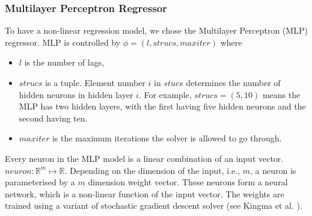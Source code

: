 \subsubsection{Multilayer Perceptron Regressor}
To have a non-linear regression model, we chose the Multilayer Perceptron (MLP) regressor. MLP is controlled by $\phi = (l, strucs, max iter)$ where
\begin{itemize}
    \item $l$ is the number of lags,
    \item $strucs$ is a tuple. Element number $i$ in $stucs$ determines the number of hidden neurons in hidden layer $i$. For example, $strucs = (5, 10)$ means the MLP has two hidden layers, with the first having five hidden neurons and the second having ten.
    \item $max iter$ is the maximum iterations the solver is allowed to go through.
\end{itemize}
Every neuron in the MLP model is a linear combination of an input vector. $neuron: \mathbb{R}^m \longmapsto \mathbb{R}$. Depending on the dimension of the input, i.e., $m$, a neuron is parameterised by a $m$ dimension weight vector. These neurons form a neural network, which is a non-linear function of the input vector. The weights are trained using a variant of stochastic gradient descent solver (see Kingma et al. \citeyear{kingma2014adam}).

